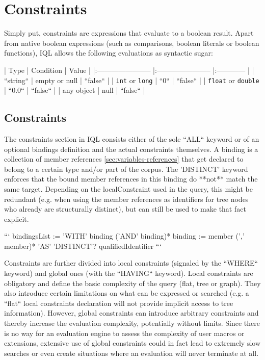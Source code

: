 \documentclass[11pt]{article}
\begin{document}
\section{Constraints}
\label{sec:cosntraints}

Simply put, constraints are expressions that evaluate to a boolean result. Apart from native boolean expressions (such as comparisons, boolean literals or boolean functions), IQL allows the following evaluations as syntactic sugar:

|      Type               |       Condition         |    Value     |
|:----------------------- |:----------------------- |:------------ |
| ``string``              | empty or null           | ``false``    | 
| \texttt{int} or \texttt{long}     | ``0``                   | ``false``    |
| \texttt{float} or \texttt{double} | ``0.0``                 | ``false``    |
| any object              | null                    | ``false``    |


\subsection{Constraints}
\label{sec:constraints}

The constraints section in IQL consists either of the sole ``ALL`` keyword or of an optional bindings definition and the actual constraints themselves. A binding is a collection of member references \cref{sec:variables-references} that get declared to belong to a certain type and/or part of the corpus. The 'DISTINCT' keyword enforces that the bound member references in this binding do **not** match the same target. Depending on the localConstraint used in the query, this might be redundant (e.g. when using the member references as identifiers for tree nodes who already are structurally distinct), but can still be used to make that fact explicit. 

```
bindingsList := 'WITH' binding ('AND' binding)* 
binding := member (',' member)* 'AS' 'DISTINCT'? qualifiedIdentifier
```

Constraints are further divided into local constraints (signaled by the ``WHERE`` keyword) and global ones (with the ``HAVING`` keyword). Local constraints are obligatory and define the basic complexity of the query (flat, tree or graph). They also introduce certain limitations on what can be expressed or searched (e.g. a ``flat`` local constraints declaration will not provide implicit access to tree information). However, global constraints can introduce arbitrary constraints and thereby increase the evaluation complexity, potentially without limits. Since there is no way for an evaluation engine to assess the complexity of user macros or extensions, extensive use of global constraints could in fact lead to extremely slow searches or even create situations where an evaluation will never terminate at all.
\end{document}
